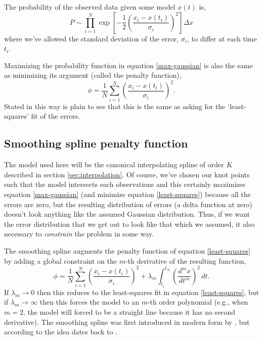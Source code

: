 \documentclass[10pt,journal]{IEEEtran}
\begin{document}
The probability of the observed data given some model $x(t)$ is,
\begin{equation}
\label{max-gaussian}
P \sim \prod_{i=1}^{N}  \exp \left[ -\frac{1}{2} \left( \frac{x_i - x(t_i)}{\sigma_i} \right)^2 \right] \Delta x
\end{equation}
where we've allowed the standard deviation of the error, $\sigma_i$, to differ at each time $t_i$.

Maximizing the probability function in equation \ref{max-gaussian} is also the same as minimizing its argument (called the penalty function),
\begin{equation}
\label{least-squares}
\phi = \frac{1}{N}\sum_{i=1}^{N} \left( \frac{x_i - x(t_i)}{\sigma_i} \right)^2 .
\end{equation}
Stated in this way is plain to see that this is the same as asking for the `least-squares' fit of the errors.


\subsection{Smoothing spline penalty function}

The model used here will be the canonical interpolating spline of order $K$ described in section \ref{sec:interpolation}. Of course, we've chosen our knot points such that the model intersects each observations and this certainly maximizes equation \ref{max-gaussian} (and minimize equation \ref{least-squares}) because all the errors are zero, but the resulting distribution of errors (a delta function at zero) doesn't look anything like the assumed Gaussian distribution. Thus, if we want the error distribution that we get out to look like that which we assumed, it also necessary to \emph{constrain} the problem in some way.

The smoothing spline augments the penalty function of equation \ref{least-squares} by adding a global constraint on the $m$-th derivative of the resulting function,
\begin{equation}
\label{smoothing-spline}
\phi =  \frac{1}{N}\sum_{i=1}^{N} \left( \frac{x_i - x(t_i)}{\sigma_i} \right) ^2 + \lambda_m \int_{t_1}^{t_N} \left(\frac{d^m x}{dt^m}\right)^2 \, dt.
\end{equation}
If $\lambda_m \rightarrow 0$ then this reduces to the least-squares fit in equation \ref{least-squares}, but if $\lambda_m \rightarrow \infty$ then this forces the model to an $m$-th order polynomial (e.g., when $m=2$, the model will forced to be a straight line because it has no second derivative). The smoothing spline was first introduced in modern form by \cite{reinsch1967-nm}, but according to \cite{deboor1978-book} the idea dates back to \cite{whittaker1923-pems}.
\end{document}
